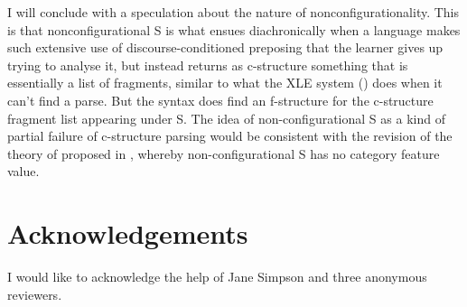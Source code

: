 \documentclass[output=paper,hidelinks]{langscibook}
\begin{document}
I will conclude with a speculation about the nature of nonconfigurationality. This is that nonconfigurational S is what ensues diachronically when a language       makes such extensive use of discourse-conditioned preposing that the learner gives up trying to analyse it, but instead returns as c-structure something       that is essentially a list of fragments, similar to what the XLE system () does when it can’t find a parse.  But the syntax does find an f-structure for the c-structure fragment list appearing under S.
The idea of non-configurational S as a kind of partial failure of c-structure
parsing would be consistent with the revision of the theory of \citet{low:lov:20}
proposed in \citet{Lovestrand2022}, whereby non-configurational S has no category
feature value. 

\section*{Acknowledgements}
I would like to acknowledge the help of Jane Simpson and three anonymous reviewers.

\sloppy
\printbibliography[heading=subbibliography,notkeyword=this]
\end{document}
